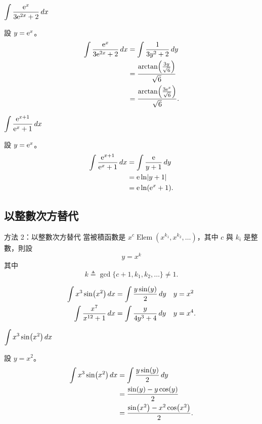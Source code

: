 \documentclass{beamer}
\newcommand{\Left} {\mathopen{}\mathclose\bgroup\left}
\newcommand{\Right}{\aftergroup\egroup\right}
\newcommand{\e}{\textup e}
\newcommand{\Elem}{\operatorname{Elem}}
\theoremstyle{remark}
\begin{document}
\begin{frame}{$\displaystyle \int \frac{\e^x}{3\e^{2x} + 2}\,dx$}
  \begin{solution}
    設 $y = \e^x$。
    \begin{align*}
      \int \frac{\e^x}{3\e^{2x} + 2}\,dx &= \int \frac{1}{3y^2 + 2}\,dy\\
	&= \frac{\arctan \Left( \frac{3y}{\sqrt6} \Right)}{\sqrt6}\\
	&= \frac{\arctan \Left( \frac{3\e^x}{\sqrt6} \Right)}{\sqrt6}.
    \end{align*}
  \end{solution}
\end{frame}

\begin{frame}{$\displaystyle \int \frac{\e^{x+1}}{\e^x + 1}\,dx$}
  \begin{solution}
    設 $y = \e^x$。
    \begin{align*}
      \int \frac{\e^{x+1}}{\e^x + 1}\,dx &= \int \frac{\e}{y + 1}\,dy\\
	&= \e \ln \Left| y+1 \Right|\\
	&= \e \ln \Left( \e^x + 1 \Right).
    \end{align*}
  \end{solution}
\end{frame}

\subsection[冪替代]{以整數次方替代}
\begin{frame}{方法 2：以整數次方替代}
  當被積函數是 $x^c \Elem(x^{k_1}, x^{k_2}, \dots)$，其中 $c$ 與 $k_i$ 是整數，則設
  \[y = x^k\]
  其中
  \[k \triangleq \gcd\{c+1, k_1, k_2, \dots\} \ne 1.\]
  \begin{example}
    \begin{align*}
      \int x^3 \sin \Left( x^2 \Right)\,dx &= \int \frac{y \sin(y)}{2}\,dy & y = x^2\phantom.\\
      \int \frac{x^7}{x^{12} + 1}\,dx &= \int \frac{y}{4y^3 + 4}\,dy       & y = x^4.
    \end{align*}
  \end{example}
\end{frame}

\begin{frame}{$\displaystyle \int x^3 \sin \Left( x^2 \Right)\,dx$}
  \begin{solution}
    設 $y = x^2$。
    \begin{align*}
      \int x^3 \sin \Left( x^2 \Right)\,dx &= \int \frac{y \sin(y)}{2}\,dy\\
	&= \frac{\sin(y) - y\cos(y)}{2}\\
	&= \frac{\sin \Left( x^2 \Right) - x^2 \cos \Left( x^2 \Right)}{2}.
    \end{align*}
  \end{solution}
\end{frame}
\end{document}
